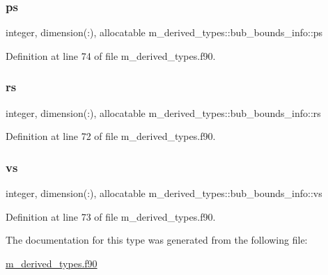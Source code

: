 \subsubsection{\texorpdfstring{ps}{ps}}
{\footnotesize\ttfamily integer, dimension(\+:), allocatable m\+\_\+derived\+\_\+types\+::bub\+\_\+bounds\+\_\+info\+::ps}



Definition at line 74 of file m\+\_\+derived\+\_\+types.\+f90.

\mbox{\label{structm__derived__types_1_1bub__bounds__info_aa3a7d88d4bc7e857c54d3e7b09784f85}} 
\subsubsection{\texorpdfstring{rs}{rs}}
{\footnotesize\ttfamily integer, dimension(\+:), allocatable m\+\_\+derived\+\_\+types\+::bub\+\_\+bounds\+\_\+info\+::rs}



Definition at line 72 of file m\+\_\+derived\+\_\+types.\+f90.

\mbox{\label{structm__derived__types_1_1bub__bounds__info_aafe6965d5ebb0a946bda443cfdd6b840}} 
\subsubsection{\texorpdfstring{vs}{vs}}
{\footnotesize\ttfamily integer, dimension(\+:), allocatable m\+\_\+derived\+\_\+types\+::bub\+\_\+bounds\+\_\+info\+::vs}



Definition at line 73 of file m\+\_\+derived\+\_\+types.\+f90.



The documentation for this type was generated from the following file\+:\begin{DoxyCompactItemize}
\item 
\hyperlink{m__derived__types_8f90}{m\+\_\+derived\+\_\+types.\+f90}\end{DoxyCompactItemize}
